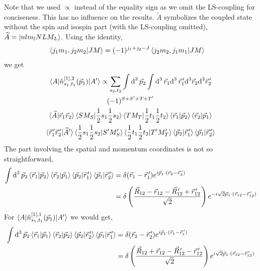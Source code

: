 \documentclass[10pt]{article}
\begin{document}
Note that we used $\propto$ instead of the equality sign as we omit the 
LS-coupling for conciseness. This has no influence on the results. 
$\widetilde{A}$ symbolizes the coupled state without the spin and isospin part 
(with the LS-coupling omitted), $\widetilde{A} = \ket{ n l m_l N L M_L}$.  
Using the identity,
\begin{align*}
	\braket{ j_1 m_1, j_2 m_2 | J M } &= (-1)^{j_1 + j_2 - J} \braket{ j_2 
m_2, j_1 m_1 | J M} 
\end{align*}
we get
\begin{multline*}
	\braket{ A | \hat{n}^{[1],2}_{s_1,t_1}(\vec{p}_1)| A'}	\propto 
\sum_{s_2,t_2} \int \text{d}^{3} \, \vec{p}_{2} \int \text{d}^{3} \, 
\vec{r}_{1} 
\text{d}^{3} \, \vec{r}_{1}^{\,\prime} \text{d}^{3} \vec{r}_{2} \text{d}^{3} 
\vec{r}_{2}^{\,\prime} \\
	(-1)^{  S + S' + T + T'} \\
	\braket{ \widetilde{A} | \vec{r}_{1} \vec{r}_{2}} \braket { S M_S | 
\frac{1}{2} s_1 \frac{1}{2} s_2 } \braket{ T M_T | \frac{1}{2} t_1 \frac{1}{2} 
t_2 } \braket{ \vec{r}_{1} | \vec{p}_{2} } \braket{ \vec{r}_{2} | \vec{p}_{1}} 
\\
	\braket{ \vec{r}_{1}^{\,\prime} \vec{r}_{2}^{\,\prime} | 
\widetilde{A}'} \braket{ \frac{1}{2} s_1 \frac{1}{2} s_2 | S' M_S'} \braket{ 
\frac{1}{2} t_1 \frac{1}{2} t_2 | T' M_T'} \braket{ \vec{p}_2 | 
\vec{r}_{1}^{\,\prime}} \braket{ \vec{p}_{1} | \vec{r}_{2}^{\,\prime}} \\
\end{multline*}
The part involving the spatial and momentum coordinates is not so 
straightforward,
\begin{align*}
	\int \text{d}^{3}\,\vec{p}_{2} \braket{ \vec{r}_{1} | \vec{p}_{2} } 
\braket{ \vec{r}_{2} | \vec{p}_{1}} \braket{ \vec{p}_2 | 
\vec{r}_{1}^{\,\prime}} \braket{ \vec{p}_{1} | \vec{r}_{2}^{\,\prime}} &= 
\delta( \vec{r}_{1} - \vec{r}_{1}^{\,\prime}) e^{i \vec{p}_{1} \cdot ( 
\vec{r}_{2} - \vec{r}_{2}^{\,\prime})} \\
	&= \delta \left( \frac{ \vec{R}_{12} - \vec{r}_{12} - 
\vec{R}_{12}^{\,\prime} + \vec{r}_{12}^{\,\prime}}{\sqrt{2}} \right) e^{ - i 
\sqrt{2} \vec{p}_{1} \cdot ( \vec{r}_{12} - \vec{r}_{12}^{\, \prime})}
\end{align*}
For $\braket{ A | \hat{n}^{[1],1}_{s_1,t_1}(\vec{p}_1) | A'} $ we would get,
\begin{align*}
	\int \text{d}^{3}\,\vec{p}_{2} \braket{ \vec{r}_{1} | \vec{p}_{1} } 
\braket{ \vec{r}_{2} | \vec{p}_{2}} \braket{ \vec{p}_2 | 
\vec{r}_{2}^{\,\prime}} \braket{ \vec{p}_{1} | \vec{r}_{1}^{\,\prime}} &= 
\delta( \vec{r}_{2} - \vec{r}_{2}^{\,\prime}) e^{i \vec{p}_{1} \cdot ( 
\vec{r}_{1} - \vec{r}_{1}^{\,\prime})} \\
	&= \delta \left( \frac{ \vec{R}_{12} + \vec{r}_{12} - 
\vec{R}_{12}^{\,\prime} - \vec{r}_{12}^{\,\prime}}{\sqrt{2}} \right) e^{ i 
\sqrt{2} \vec{p}_{1} \cdot ( \vec{r}_{12} - \vec{r}_{12}^{\, \prime})}
\end{align*}
\end{document}
